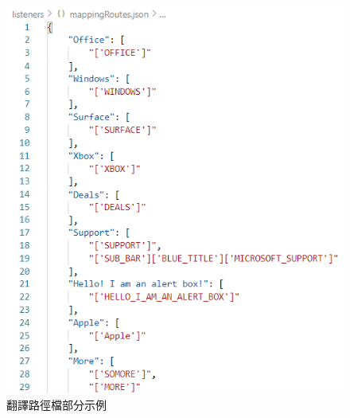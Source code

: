 \begin{figure}[H]
    \includegraphics[width= 1.1\textwidth]{../論文截圖/3-1-3-3 翻譯路徑檔.png}
    \caption{翻譯路徑檔部分示例}
    \label{翻譯路徑檔}
\end{figure}
